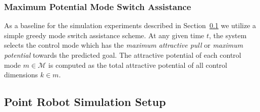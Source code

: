 \documentclass[conference]{IEEEtran}
\begin{document}
\subsubsection{Maximum Potential Mode Switch Assistance}\label{sssec:baseline}
As a baseline for the simulation experiments described in Section~\ref{ssec:sim} we utilize a simple greedy mode switch assistance scheme. At any given time $t$, the system selects the control mode which has the \textit{maximum attractive pull} or \textit{maximum potential} towards the predicted goal. 
The attractive potential of each control mode $m \in \mathcal{M}$ is computed as the total attractive potential of all control dimensions $k \in m$.

\subsection{Point Robot Simulation Setup}\label{ssec:sim}
\end{document}
